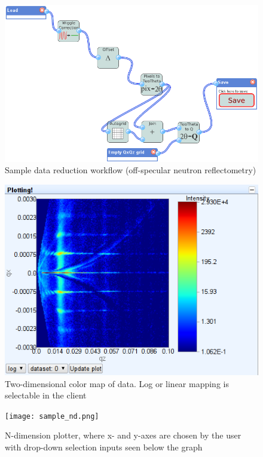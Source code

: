 \documentclass[pdf]{iucr}           %
\begin{document}

\begin{figure}\label{figure:sample_workflow}
\caption{Sample data reduction workflow (off-specular neutron reflectometry)}
\includegraphics[width=\linewidth]{sample_diagram.png}
\end{figure}

\begin{figure}\label{figure:twod_plot}
\caption{Two-dimensional color map of data.  Log or linear mapping is selectable in
the client}
\includegraphics[width=\linewidth]{twod_plot.png}
\end{figure}

\begin{figure}\label{figure:nd_plot}
\caption{N-dimension plotter, where x- and y-axes are chosen by the user with drop-down selection inputs seen below the graph}
\texttt{[image: sample\_nd.png]}
\end{figure}
\end{document}
